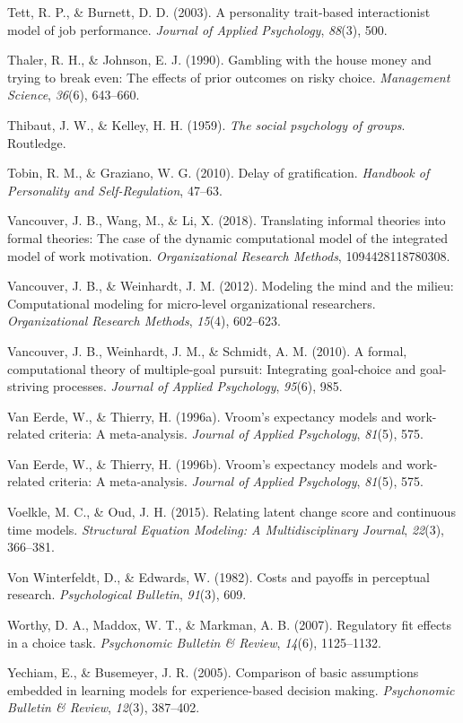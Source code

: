 \documentclass[english,,man]{apa6}
\theoremstyle{definition}
\theoremstyle{definition}
\theoremstyle{definition}
\theoremstyle{remark}
\begin{document}
\leavevmode\hypertarget{ref-tett2003}{}%
Tett, R. P., \& Burnett, D. D. (2003). A personality trait-based
interactionist model of job performance. \emph{Journal of Applied
Psychology}, \emph{88}(3), 500.

\leavevmode\hypertarget{ref-thaler1990}{}%
Thaler, R. H., \& Johnson, E. J. (1990). Gambling with the house money
and trying to break even: The effects of prior outcomes on risky choice.
\emph{Management Science}, \emph{36}(6), 643--660.

\leavevmode\hypertarget{ref-thibaut1959}{}%
Thibaut, J. W., \& Kelley, H. H. (1959). \emph{The social psychology of
groups}. Routledge.

\leavevmode\hypertarget{ref-tobin2010}{}%
Tobin, R. M., \& Graziano, W. G. (2010). Delay of gratification.
\emph{Handbook of Personality and Self-Regulation}, 47--63.

\leavevmode\hypertarget{ref-vancouver2018}{}%
Vancouver, J. B., Wang, M., \& Li, X. (2018). Translating informal
theories into formal theories: The case of the dynamic computational
model of the integrated model of work motivation. \emph{Organizational
Research Methods}, 1094428118780308.

\leavevmode\hypertarget{ref-vancouver2012}{}%
Vancouver, J. B., \& Weinhardt, J. M. (2012). Modeling the mind and the
milieu: Computational modeling for micro-level organizational
researchers. \emph{Organizational Research Methods}, \emph{15}(4),
602--623.

\leavevmode\hypertarget{ref-vancouver2010}{}%
Vancouver, J. B., Weinhardt, J. M., \& Schmidt, A. M. (2010). A formal,
computational theory of multiple-goal pursuit: Integrating goal-choice
and goal-striving processes. \emph{Journal of Applied Psychology},
\emph{95}(6), 985.

\leavevmode\hypertarget{ref-van1996}{}%
Van Eerde, W., \& Thierry, H. (1996a). Vroom's expectancy models and
work-related criteria: A meta-analysis. \emph{Journal of Applied
Psychology}, \emph{81}(5), 575.

\leavevmode\hypertarget{ref-vaneerde1996}{}%
Van Eerde, W., \& Thierry, H. (1996b). Vroom's expectancy models and
work-related criteria: A meta-analysis. \emph{Journal of Applied
Psychology}, \emph{81}(5), 575.

\leavevmode\hypertarget{ref-voelkle2015relating}{}%
Voelkle, M. C., \& Oud, J. H. (2015). Relating latent change score and
continuous time models. \emph{Structural Equation Modeling: A
Multidisciplinary Journal}, \emph{22}(3), 366--381.

\leavevmode\hypertarget{ref-von1982}{}%
Von Winterfeldt, D., \& Edwards, W. (1982). Costs and payoffs in
perceptual research. \emph{Psychological Bulletin}, \emph{91}(3), 609.

\leavevmode\hypertarget{ref-worthy2007}{}%
Worthy, D. A., Maddox, W. T., \& Markman, A. B. (2007). Regulatory fit
effects in a choice task. \emph{Psychonomic Bulletin \& Review},
\emph{14}(6), 1125--1132.

\leavevmode\hypertarget{ref-yechiam2005}{}%
Yechiam, E., \& Busemeyer, J. R. (2005). Comparison of basic assumptions
embedded in learning models for experience-based decision making.
\emph{Psychonomic Bulletin \& Review}, \emph{12}(3), 387--402.
\end{document}
